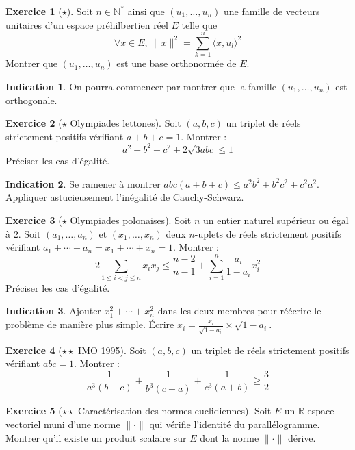 \documentclass[french]{book}
\newcommand{\N}{\mathbb{N}}
\newcommand{\R}{\mathbb{R}}
\newcommand{\st}{^*}
\theoremstyle{definition}
\newtheorem{ex}{Exercice}[chapter]
\theoremstyle{theorem}
\newtheorem*{ind}{Indication}
\theoremstyle{remark}
\begin{document}
\begin{ex}[$\star$]
	Soit $n\in\N\st$ ainsi que $(u_1,\ldots,u_n)$ une famille de vecteurs unitaires d'un espace préhilbertien réel $E$ telle que $$\forall x\in E,\ \lVert x\rVert^2=\sum_{k=1}^{n}\langle x,u_l\rangle^2$$ Montrer que $(u_1,\ldots,u_n)$ est une base orthonormée de $E$.
\end{ex}

\begin{ind}
	On pourra commencer par montrer que la famille $(u_1,\ldots,u_n)$ est orthogonale.
\end{ind}

\begin{ex}[$\star$ Olympiades lettones]
	Soit $(a,b,c)$ un triplet de réels strictement positifs vérifiant $a+b+c=1$. Montrer : $$a^2+b^2+c^2+2\sqrt{3abc}\leqslant 1$$ Préciser les cas d'égalité.
\end{ex}

\begin{ind}
	Se ramener à montrer $abc(a+b+c)\leqslant a^2b^2+b^2c^2+c^2a^2$. Appliquer astucieusement l'inégalité de Cauchy-Schwarz.
\end{ind}

\begin{ex}[$\star$ Olympiades polonaises]
	Soit $n$ un entier naturel supérieur ou égal à $2$. Soit $(a_1,\ldots,a_n)$ et $(x_1,\ldots,x_n)$ deux $n$-uplets de réels strictement positifs vérifiant $a_1+\cdots+a_n=x_1+\cdots+x_n=1$. Montrer : $$2\sum_{1\leqslant i<j\leqslant n}x_ix_j\leqslant\frac{n-2}{n-1}+\sum_{i=1}^{n}\frac{a_i}{1-a_i}x_i^2$$
	Préciser les cas d'égalité.
\end{ex}

\begin{ind}
	Ajouter $x_1^2+\cdots+x_n^2$ dans les deux membres pour réécrire le problème de manière plus simple. Écrire $x_i=\displaystyle\frac{x_i}{\sqrt{1-a_i}}\times\sqrt{1-a_i}$. 
\end{ind}

\begin{ex}[$\star\star$ IMO 1995]
	Soit $(a,b,c)$ un triplet de réels strictement positifs vérifiant $abc=1$. Montrer : $$\frac{1}{a^3(b+c)}+\frac{1}{b^3(c+a)}+\frac{1}{c^3(a+b)}\geqslant\frac{3}{2}$$
\end{ex}

\begin{ex}[$\star\star$ Caractérisation des normes euclidiennes]
	Soit $E$ un $\R$-espace vectoriel muni d'une norme $\lVert\cdot\rVert$ qui vérifie l'identité du parallélogramme. Montrer qu'il existe un produit scalaire sur $E$ dont la norme $\lVert\cdot\rVert$ dérive.
\end{ex}
\end{document}
